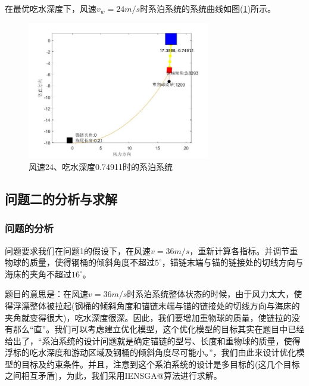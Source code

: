 \documentclass[UTF8]{ctexbook}
\makeatletter
\theoremstyle{nonumberplain}
\newcommand*{\rom}[1]{\expandafter\@slowromancap\romannumeral #1@}
\makeatother
\begin{document}
            在最优吃水深度下，风速$v_w=24m/s$时系泊系统的系统曲线如图(\ref{风速24、吃水深度0.74911时的系泊系统})所示。
            \begin{figure}[H]
                \centering
                \includegraphics[width=8cm]{images/v_wind_24_h_xitong.jpg}
                \caption{风速24、吃水深度0.74911时的系泊系统}
                \label{风速24、吃水深度0.74911时的系泊系统}
            \end{figure}


    \subsection{问题二的分析与求解}
        \subsubsection{问题的分析}
            \par
            问题要求我们在问题1的假设下，在风速$v=36m/s$，重新计算各指标。并调节重物球的质量，使得钢桶的倾斜角度不超过$5^\circ$，锚链末端与锚的链接处的切线方向与海床的夹角不超过$16^\circ$。
            \par
            题目的意思是：在风速$v=36m/s$时系泊系统整体状态的时候，由于风力太大，使得浮漂整体被拉起(钢桶的倾斜角度和锚链末端与锚的链接处的切线方向与海床的夹角就变得很大)，吃水深度很深。因此，我们要增加重物球的质量，使链拉的没有那么“直”。我们可以考虑建立优化模型，这个优化模型的目标其实在题目中已经给出了，“系泊系统的设计问题就是确定锚链的型号、长度和重物球的质量，使得浮标的吃水深度和游动区域及钢桶的倾斜角度尽可能小。”，我们由此来设计优化模型的目标及约束条件。并且，注意到这个系泊系统的设计是多目标的(这几个目标之间相互矛盾)，为此，我们采用IENSGA\rom{2}算法进行求解。
\end{document}
